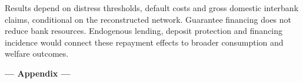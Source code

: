 \documentclass[preprint,12pt,authoryear]{elsarticle}
\begin{document}
Results depend on distress thresholds, default costs and gross domestic interbank claims, conditional on the reconstructed network. Guarantee financing does not reduce bank resources. Endogenous lending, deposit protection and financing incidence would connect these repayment effects to broader consumption and welfare outcomes.


\clearpage
\setcounter{section}{0}

\begin{center}
\begin{large}

{\bf--- Appendix ---}

\end{large}

\end{center}


\vspace{1cm}


\setcounter{subsection}{0}
\setcounter{equation}{0}

\appendix
{}
\renewcommand{\thesection}{\Alph{section}}
\renewcommand{\thesubsection}{\thesection.\arabic{subsection}}
\renewcommand{\theequation}{\thesection.\arabic{equation}}
\renewcommand{\thetable}{\thesection.\arabic{table}}
\renewcommand{\thefigure}{\thesection.\arabic{figure}}





\end{document}

